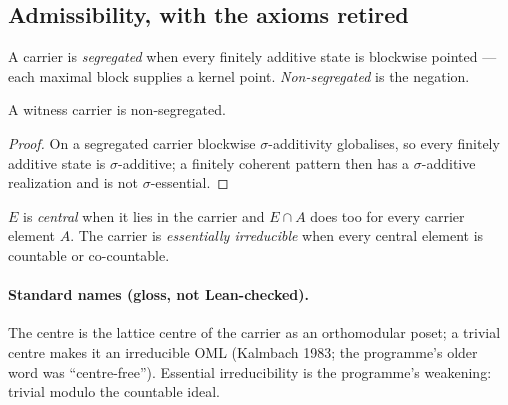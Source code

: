 \subsection{Admissibility, with the axioms retired}

\begin{definition}
  \label{def:segregated}
  \leanok
  A carrier is \emph{segregated} when every finitely additive state is blockwise
  pointed --- each maximal block supplies a kernel point. \emph{Non-segregated}
  is the negation.
\end{definition}

\begin{lemma}
  \label{lem:witness-nonsegregated}
  \leanok
  A witness carrier is non-segregated.
\end{lemma}

\begin{proof}
  \leanok
  On a segregated carrier blockwise $\sigma$-additivity globalises, so every
  finitely additive state is $\sigma$-additive; a finitely coherent pattern then
  has a $\sigma$-additive realization and is not $\sigma$-essential.
\end{proof}

\begin{definition}
  \label{def:essentially-irreducible}
  \leanok
  $E$ is \emph{central} when it lies in the carrier and $E \cap A$ does too for
  every carrier element $A$. The carrier is \emph{essentially irreducible} when
  every central element is countable or co-countable.
\end{definition}

\paragraph{Standard names (gloss, not Lean-checked).} The centre is the lattice
centre of the carrier as an orthomodular poset; a trivial centre makes it an
irreducible OML (Kalmbach 1983; the programme's older word was
``centre-free''). Essential irreducibility is the programme's weakening:
trivial modulo the countable ideal.

